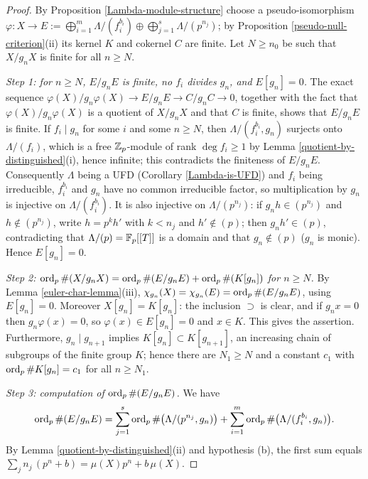 \begin{proof}
\leanok
By Proposition \ref{Lambda-module-structure} choose a pseudo-isomorphism
$\varphi:X\to E:=\bigoplus_{i=1}^m\Lambda/(f_i^{b_i})
\oplus\bigoplus_{j=1}^s\Lambda/(p^{n_j})$; by
Proposition \ref{pseudo-null-criterion}(ii) its kernel $K$ and cokernel $C$ are
finite. Let $N\geq n_0$ be such that $X/g_nX$ is finite for all $n\geq N$.

\emph{Step 1: for $n\geq N$, $E/g_nE$ is finite, no $f_i$ divides $g_n$, and
$E[g_n]=0$.}
The exact sequence
$\varphi(X)/g_n\varphi(X)\to E/g_nE\to C/g_nC\to 0$, together with the fact that
$\varphi(X)/g_n\varphi(X)$ is a quotient of $X/g_nX$ and that $C$ is finite,
shows that $E/g_nE$ is finite.
If $f_i\mid g_n$ for some $i$ and some $n\geq N$, then $\Lambda/(f_i^{b_i},g_n)$
surjects onto $\Lambda/(f_i)$, which is a free ${\mathbb {Z}}_p$-module of rank
$\deg f_i\geq 1$ by Lemma \ref{quotient-by-distinguished}(i), hence infinite;
this contradicts the finiteness of $E/g_nE$.
Consequently $\Lambda$ being a UFD (Corollary \ref{Lambda-is-UFD}) and $f_i$
being irreducible, $f_i^{b_i}$ and $g_n$ have no common irreducible factor, so
multiplication by $g_n$ is injective on $\Lambda/(f_i^{b_i})$.
It is also injective on $\Lambda/(p^{n_j})$: if $g_nh\in(p^{n_j})$ and
$h\notin(p^{n_j})$, write $h=p^kh'$ with $k<n_j$ and $h'\notin(p)$; then
$g_nh'\in(p)$, contradicting that $\Lambda/(p)={\mathbb {F}}_p[[T]]$ is a domain and that
$g_n\notin(p)$ ($g_n$ is monic). Hence $E[g_n]=0$.

\emph{Step 2: $\operatorname{ord}_p\#(X/g_nX)=\operatorname{ord}_p\#(E/g_nE)+\operatorname{ord}_p\#(K[g_n])$ for
$n\geq N$.}
By Lemma \ref{euler-char-lemma}(iii),
$\chi_{g_n}(X)=\chi_{g_n}(E)=\operatorname{ord}_p\#(E/g_nE)$, using $E[g_n]=0$.
Moreover $X[g_n]=K[g_n]$: the inclusion $\supset$ is clear, and if $g_nx=0$ then
$g_n\varphi(x)=0$, so $\varphi(x)\in E[g_n]=0$ and $x\in K$.
This gives the assertion.
Furthermore, $g_n\mid g_{n+1}$ implies $K[g_n]\subset K[g_{n+1}]$, an increasing
chain of subgroups of the finite group $K$; hence there are $N_1\geq N$ and a
constant $c_1$ with $\operatorname{ord}_p\#K[g_n]=c_1$ for all $n\geq N_1$.

\emph{Step 3: computation of $\operatorname{ord}_p\#(E/g_nE)$.}
We have
$$\operatorname{ord}_p\#(E/g_nE)=\sum_{j=1}^s\operatorname{ord}_p\#\big(\Lambda/(p^{n_j},g_n)\big)
+\sum_{i=1}^m\operatorname{ord}_p\#\big(\Lambda/(f_i^{b_i},g_n)\big).$$
By Lemma \ref{quotient-by-distinguished}(ii) and hypothesis (b), the first sum
equals $\sum_jn_j\,(p^n+b)=\mu(X)p^n+b\,\mu(X)$.


\end{proof}
